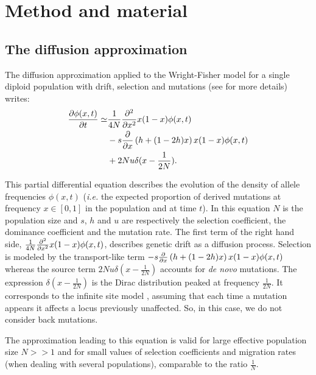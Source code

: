\section{Method and material}

\subsection{The diffusion approximation}
The diffusion approximation applied to the Wright-Fisher model for a single diploid population with drift, selection and mutations (see \cite{kimura1964} for more details) writes:
\begin{equation}
	\begin{split}
	\frac{\partial \phi(x,t)}{\partial t}\simeq &\frac{1}{4 N} \frac{\partial^2 }{\partial x^2} x(1-x) \phi(x,t) \\&-s \frac{\partial }{\partial x} \left(h+(1-2h)x \right)x (1-x) \phi(x,t) \\&+ 2 N u \delta(x-\frac{1}{2 N}).
	\end{split}
	\label{eq:diff}
\end{equation}

This partial differential equation describes the evolution of the density of allele frequencies $\phi(x,t)$ (\textit{i.e.} the expected proportion of derived mutations at frequency $x \in [0, 1]$ in the population and at time $t$). In this equation $N$ is the population size and $s$, $h$ and $u$ are respectively the selection coefficient, the dominance coefficient and the mutation rate.
The first term of the right hand side, $\frac{1}{4 N} \frac{\partial^2 }{\partial x^2} x(1-x) \phi(x,t)$, describes genetic drift as a diffusion process. Selection is modeled by the transport-like term $-s \frac{\partial }{\partial x} \left(h+(1-2h)x \right)x (1-x) \phi(x,t)$ whereas the source term $2 N u \delta(x-\frac{1}{2 N})$ accounts for \textit{de novo} mutations. The expression $\delta(x-\frac{1}{2 N})$ is the Dirac distribution peaked at frequency $\frac{1}{2 N}$. It corresponds to the infinite site model \cite{kimura1969}, assuming that each time a mutation appears it affects a locus previously unaffected. So, in this case, we do not consider back mutations.

The approximation leading to this equation is valid for large effective population size $N >> 1$ and for small values of selection coefficients and migration rates (when dealing with several populations), comparable to the ratio $\frac{1}{N}$. 

